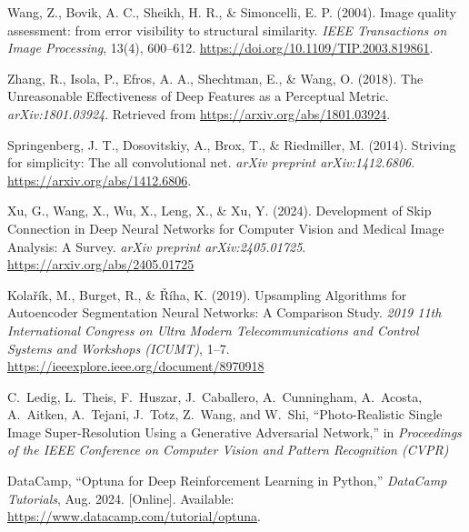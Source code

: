 \documentclass[twocolumn]{article}
\begin{document}
\begin{thebibliography}{99}
     Wang, Z., Bovik, A. C., Sheikh, H. R., \& Simoncelli, E. P. (2004). Image quality assessment: from error visibility to structural similarity. \textit{IEEE Transactions on Image Processing}, 13(4), 600–612. \url{https://doi.org/10.1109/TIP.2003.819861}.
    
     Zhang, R., Isola, P., Efros, A. A., Shechtman, E., \& Wang, O. (2018). The Unreasonable Effectiveness of Deep Features as a Perceptual Metric. \textit{arXiv:1801.03924}. Retrieved from \url{https://arxiv.org/abs/1801.03924}.

     Springenberg, J. T., Dosovitskiy, A., Brox, T., \& Riedmiller, M. (2014). Striving for simplicity: The all convolutional net. \textit{arXiv preprint arXiv:1412.6806}. \url{https://arxiv.org/abs/1412.6806}.
  
     Xu, G., Wang, X., Wu, X., Leng, X., \& Xu, Y. (2024). Development of Skip Connection in Deep Neural Networks for Computer Vision and Medical Image Analysis: A Survey. \textit{arXiv preprint arXiv:2405.01725}. \url{https://arxiv.org/abs/2405.01725}

     Kolařík, M., Burget, R., \& Říha, K. (2019). Upsampling Algorithms for Autoencoder Segmentation Neural Networks: A Comparison Study. \textit{2019 11th International Congress on Ultra Modern Telecommunications and Control Systems and Workshops (ICUMT)}, 1–7. \url{https://ieeexplore.ieee.org/document/8970918}

     C.~Ledig, L.~Theis, F.~Huszar, J.~Caballero, A.~Cunningham, A.~Acosta, A.~Aitken, A.~Tejani, J.~Totz, Z.~Wang, and W.~Shi, ``Photo-Realistic Single Image Super-Resolution Using a Generative Adversarial Network,'' in \emph{Proceedings of the IEEE Conference on Computer Vision and Pattern Recognition (CVPR)}

     DataCamp, ``Optuna for Deep Reinforcement Learning in Python,'' \textit{DataCamp Tutorials}, Aug. 2024. [Online]. Available: \url{https://www.datacamp.com/tutorial/optuna}.


  \end{thebibliography}
\end{document}
